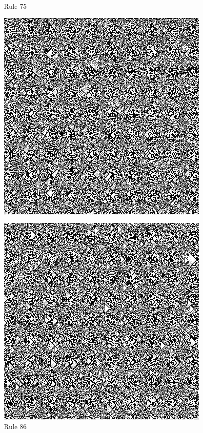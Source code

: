 \documentclass{article}
\begin{document}
\begin{figure}[H]
  \begin{center}
    \begin{minipage}{0.48\textwidth}
      \caption{Rule 75}
      \label{fig:figure4}
      \centering
      \includegraphics[scale=.5]{75.png}
    \end{minipage}
    \begin{minipage}{0.48\textwidth}
      \caption{Rule 86}
      \label{fig:figure5}
      \centering
      \includegraphics[scale=.5]{86.png}
    \end{minipage}
  \end{center}
\end{figure}
\end{document}
